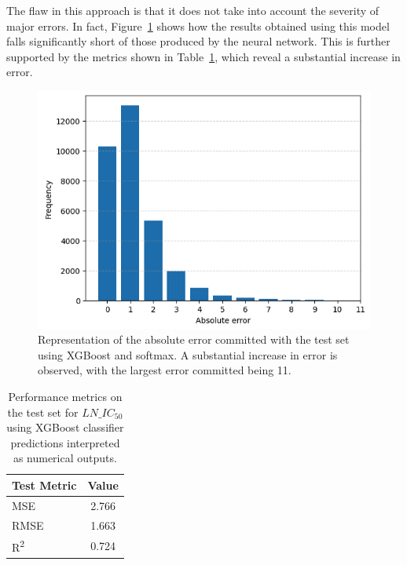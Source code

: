 The flaw in this approach is that it does not take into account the severity of major errors. In fact, Figure~\ref{fig:barplot_xgboost_v1} shows how the results obtained using this model falls significantly short of those produced by the neural network. This is further supported by the metrics shown in Table~\ref{tab:xgboost_classification_metrics_v1}, which reveal a substantial increase in error.

\begin{figure}[H]
    \centering
    \includegraphics[width=1\textwidth]{figures/xgboost_class/xgboost_class_v1_softmax.png}
    \caption{Representation of the absolute error committed with the test set using XGBoost and softmax. A substantial increase in error is observed, with the largest error committed being 11.}
    \label{fig:barplot_xgboost_v1}
\end{figure}

\begin{table}[H]
    \centering
    \begin{tabular}{|l|c|}
    \hline
    \textbf{Test Metric} & \textbf{Value} \\
    \hline
    MSE & 2.766 \\
    RMSE & 1.663 \\
    R\textsuperscript{2} & 0.724 \\
    \hline
    \end{tabular}
    \caption{Performance metrics on the test set for \(LN\_IC_{50}\) using XGBoost classifier predictions interpreted as numerical outputs.}
    \label{tab:xgboost_classification_metrics_v1}
\end{table}

